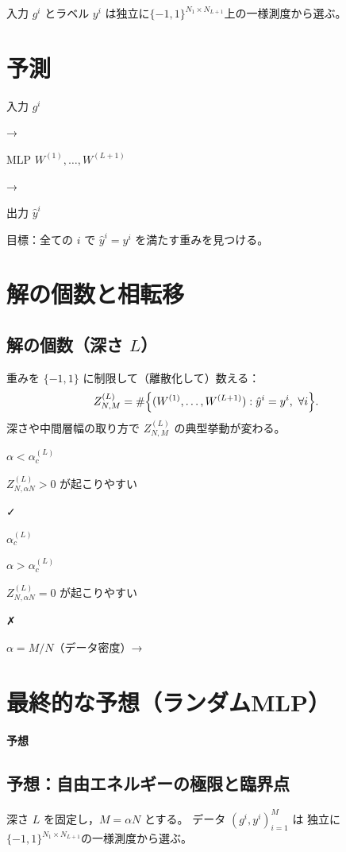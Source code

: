 \documentclass[uplatex,dvipdfmx,11pt,a4paper,openany]{bxjsbook}
\begin{document}
\allowbreak{}

入力 \( g^i \) とラベル \( y^i \) は独立に\( \{-1,1\}^{N_1\times N_{L+1}} \)上の一様測度から選ぶ。


\section{予測}
入力\allowbreak{} \( g^i \)

→

MLP\allowbreak{} \( W^{(1)},\dots,W^{(L+1)} \)

→

出力\allowbreak{} \( \hat y^i \)

目標：全ての \( i \) で
        \( \hat y^i = y^i \)
        を満たす重みを見つける。

\section{解の個数と相転移}
\subsection{解の個数（深さ \( L \)）}
重みを \( \{-1,1\} \) に制限して（離散化して）数える：
      \[Z_{N,M}^{(L)}=\#\Bigl\{(W^{(1)},\dots,W^{(L+1)}) : \hat y^i=y^i,\ \forall i\Bigr\}.\]
      深さや中間層幅の取り方で \( Z_{N,M}^{(L)} \) の典型挙動が変わる。

$\alpha < \alpha_c^{(L)}$

$Z_{N,\alpha N}^{(L)} > 0$ が起こりやすい

✓

$\alpha_c^{(L)}$

$\alpha > \alpha_c^{(L)}$

$Z_{N,\alpha N}^{(L)} = 0$ が起こりやすい

✗

$\alpha = M/N$（データ密度）→

\section{最終的な予想（ランダムMLP）}
\paragraph{予想}
\subsection{予想：自由エネルギーの極限と臨界点}
深さ $L$ を固定し，$M=\alpha N$ とする。\allowbreak{} \allowbreak{} 
      データ $(g^i,y^i)_{i=1}^{M}$ は
      独立に \( \{-1,1\}^{N_1\times N_{L+1}} \)の一様測度から選ぶ。\allowbreak{} \allowbreak{} 
\end{document}
